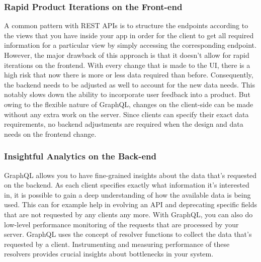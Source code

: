 \subsubsection{Rapid Product Iterations on the Front-end}

A common pattern with REST APIs is to structure the endpoints according to the views that you have inside your app 
in order for the client to get all required information for a particular view by simply accessing the corresponding 
endpoint. However, the major drawback of this approach is that it doesn’t allow for rapid iterations on the frontend. 
With every change that is made to the UI, there is a high risk that now there is more or less data required than before.
Consequently, the backend needs to be adjusted as well to account for the new data needs. This notably slows down the 
ability to incorporate user feedback into a product. But owing to the flexible nature of GraphQL, changes on the 
client-side can be made without any extra work on the server. Since clients can specify their exact data requirements, 
no backend adjustments are required when the design and data needs on the frontend change.

\subsubsection{Insightful Analytics on the Back-end}

GraphQL allows you to have fine-grained insights about the data that’s requested on the backend. As each client specifies 
exactly what information it’s interested in, it is possible to gain a deep understanding of how the available data is being 
used. This can for example help in evolving an API and deprecating specific fields that are not requested by any clients any more.
With GraphQL, you can also do low-level performance monitoring of the requests that are processed by your server. 
GraphQL uses the concept of resolver functions to collect the data that’s requested by a client. Instrumenting and measuring 
performance of these resolvers provides crucial insights about bottlenecks in your system.~\cite{GraphQLvsREST}

